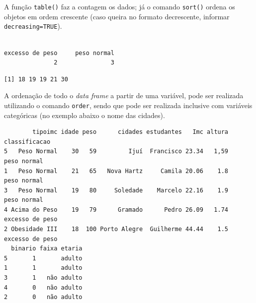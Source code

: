 \documentclass[12pt,portuguese,oneside]{book}
\newenvironment{Shaded}{\begin{snugshade}}{\end{snugshade}}
\newcommand{\KeywordTok}[1]{\textcolor[rgb]{0.13,0.29,0.53}{\textbf{#1}}}
\newcommand{\DataTypeTok}[1]{\textcolor[rgb]{0.13,0.29,0.53}{#1}}
\newcommand{\CommentTok}[1]{\textcolor[rgb]{0.56,0.35,0.01}{\textit{#1}}}
\newcommand{\OtherTok}[1]{\textcolor[rgb]{0.56,0.35,0.01}{#1}}
\newcommand{\OperatorTok}[1]{\textcolor[rgb]{0.81,0.36,0.00}{\textbf{#1}}}
\newcommand{\NormalTok}[1]{#1}
\begin{document}
A função \texttt{table()} faz a contagem os dados; já o comando
\texttt{sort()} ordena os objetos em ordem crescente (caso queira no
formato decrescente, informar \texttt{decreasing=TRUE}).

\begin{Shaded}
\end{Shaded}

\begin{verbatim}

excesso de peso     peso normal 
              2               3 
\end{verbatim}

\begin{Shaded}
\end{Shaded}

\begin{verbatim}
[1] 18 19 19 21 30
\end{verbatim}

A ordenação de todo o \emph{data frame} a partir de uma variável, pode
ser realizada utilizando o comando \texttt{order}, sendo que pode ser
realizada inclusive com variáveis categóricas (no exemplo abaixo o nome
das cidades).

\begin{Shaded}
\end{Shaded}

\begin{verbatim}
        tipoimc idade peso      cidades estudantes   Imc altura   classificacao
5   Peso Normal    30   59         Ijuí  Francisco 23.34   1,59     peso normal
1   Peso Normal    21   65   Nova Hartz     Camila 20.06    1.8     peso normal
3   Peso Normal    19   80     Soledade    Marcelo 22.16    1.9     peso normal
4 Acima do Peso    19   79      Gramado      Pedro 26.09   1.74 excesso de peso
2 Obesidade III    18  100 Porto Alegre  Guilherme 44.44    1.5 excesso de peso
  binario faixa etaria
5       1       adulto
1       1       adulto
3       1   não adulto
4       0   não adulto
2       0   não adulto
\end{verbatim}
\end{document}
